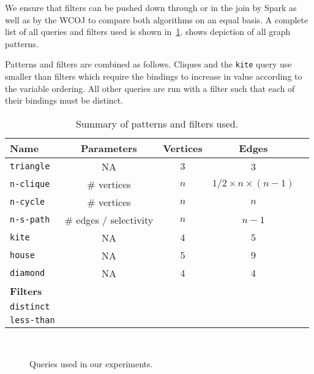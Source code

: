 We ensure that filters can be pushed down through or in the join by Spark as well as by the WCOJ to compare both algorithms on an equal basis.
A complete list of all queries and filters used is shown in~\cref{table:patterns}.
 shows depiction of all graph patterns.

Patterns and filters are combined as follows.
Cliques and the \texttt{kite} query use smaller than filters which require the bindings to increase
in value according to the variable ordering.
All other queries are run with a filter such that each of their bindings must be distinct.

\begin{table}[]
    \centering
    \begin{tabular}{@{}lcccp{6cm}@{}}
        \toprule
        Name     & Parameters                 & Vertices & Edges

        \\ \midrule
        \texttt{triangle} & NA                          & $3$        & 3                 \\
        \texttt{n-clique} & \# vertices                & $n$        & $1/2 \times n \times (n - 1)$ \\
        \texttt{n-cycle}  & \# vertices                & $n$        & $n$                 \\
        \texttt{n-s-path} & \# edges / selectivity  & $n$       & $n - 1$                 \\
        \texttt{kite}  & NA                         & $4$        & $5$                    \\
        \texttt{house}    & NA                         & $5$        & $9$                 \\
        \texttt{diamond}  & NA                         & $4$        & $4$                 \\
        \textbf{Filters}   &                            &          &                   \\
        \texttt{distinct}  &                            &          &                   \\
        \texttt{less-than} &                            &          &                   \\ \bottomrule
    \end{tabular}
    \caption{Summary of patterns and filters used.}
    \label{table:patterns}
\end{table}

\begin{figure}
    \centering
    \subfloat[triangle]{}
    \subfloat[4-clique]{}
    \subfloat[5-clique]{}
    \subfloat[4-cycle]{}\\
    \subfloat[5-cycle]{}
    \subfloat[diamond]{}
    \subfloat[kite]{}
    \caption{Queries used in our experiments.}
    \label{fig:all-queries}
\end{figure}

